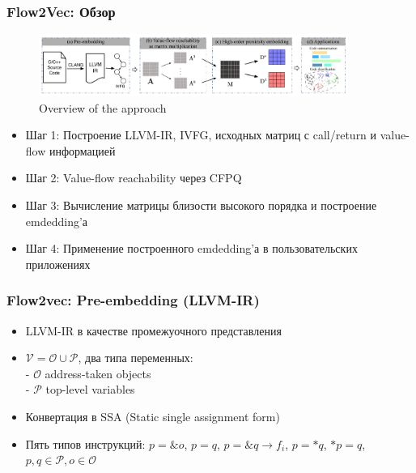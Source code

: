 \documentclass[xcolor=table,english]{beamer}
\begin{document}
\begin{frame}[fragile] \frametitle{Flow2Vec: Обзор}
    \begin{minipage}[m]{\linewidth}
        \begin{figure}
            \centering
            \includegraphics[width=0.9\textwidth]{figures/flow2vec_idea.png}
            \caption{Overview of the approach}
        \end{figure}
    \end{minipage}\hfill
    \begin{minipage}[m]{\linewidth}
        \begin{itemize}
            \item Шаг 1: Построение LLVM-IR, IVFG, исходных матриц с call/return и value-flow информацией
            \item Шаг 2: Value-flow reachability через CFPQ
            \item Шаг 3: Вычисление матрицы близости высокого порядка и построение emdedding'а
            \item Шаг 4: Применение построенного emdedding'а в пользовательских приложениях
        \end{itemize}
    \end{minipage}
\end{frame}

\begin{frame}[fragile] \frametitle{Flow2vec: Pre-embedding (LLVM-IR)}
    \begin{itemize}
        \item LLVM-IR в качестве промежуочного представления
        \item $\mathcal{V} = \mathcal{O} \cup \mathcal{P}$, два типа переменных:
        \\- $\mathcal{O}$ address-taken objects
        \\- $\mathcal{P}$ top-level variables
        \item Конвертация в SSA (Static single assignment form) 
        \item Пять типов инструкций: $p=\&o$, $p=q$, $p=\&q \rightarrow f_i$, $p=*q$, $*p=q$, 
        $p, q \in \mathcal{P}, o \in \mathcal{O}$
    \end{itemize}
\end{frame}
\end{document}
